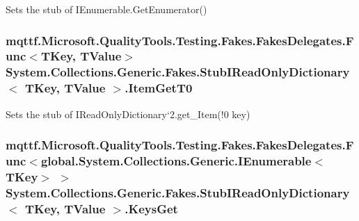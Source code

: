 Sets the stub of I\-Enumerable.\-Get\-Enumerator()

\hypertarget{class_system_1_1_collections_1_1_generic_1_1_fakes_1_1_stub_i_read_only_dictionary_3_01_t_key_00_01_t_value_01_4_a019cc755cab2eb7ec5c88cbc88a207a5}{
\subsubsection[{Item\-Get\-T0}]{\setlength{\rightskip}{0pt plus 5cm}mqttf.\-Microsoft.\-Quality\-Tools.\-Testing.\-Fakes.\-Fakes\-Delegates.\-Func$<$T\-Key, T\-Value$>$ System.\-Collections.\-Generic.\-Fakes.\-Stub\-I\-Read\-Only\-Dictionary$<$ T\-Key, T\-Value $>$.Item\-Get\-T0}}\label{class_system_1_1_collections_1_1_generic_1_1_fakes_1_1_stub_i_read_only_dictionary_3_01_t_key_00_01_t_value_01_4_a019cc755cab2eb7ec5c88cbc88a207a5}


Sets the stub of I\-Read\-Only\-Dictionary`2.get\-\_\-\-Item(!0 key)

\hypertarget{class_system_1_1_collections_1_1_generic_1_1_fakes_1_1_stub_i_read_only_dictionary_3_01_t_key_00_01_t_value_01_4_aab359199279169e58b9ec956674dc7de}{
\subsubsection[{Keys\-Get}]{\setlength{\rightskip}{0pt plus 5cm}mqttf.\-Microsoft.\-Quality\-Tools.\-Testing.\-Fakes.\-Fakes\-Delegates.\-Func$<$global.\-System.\-Collections.\-Generic.\-I\-Enumerable$<$T\-Key$>$ $>$ System.\-Collections.\-Generic.\-Fakes.\-Stub\-I\-Read\-Only\-Dictionary$<$ T\-Key, T\-Value $>$.Keys\-Get}}\label{class_system_1_1_collections_1_1_generic_1_1_fakes_1_1_stub_i_read_only_dictionary_3_01_t_key_00_01_t_value_01_4_aab359199279169e58b9ec956674dc7de}


